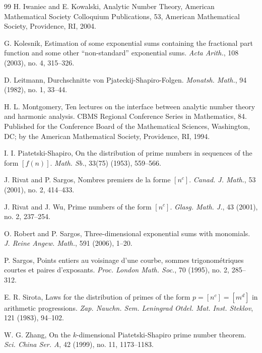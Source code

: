 \documentclass[12pt, reqno, twoside, letterpaper]{amsart}
\numberwithin{equation}{section}
\theoremstyle{customthm}
\theoremstyle{customrem}
\begin{document}
\begin{thebibliography}{99}
H. Iwaniec and E. Kowalski,
Analytic Number Theory, American Mathematical Society Colloquium Publications, 53, American Mathematical Society, Providence, RI, 2004.

G. Kolesnik,
Estimation of some exponential sums containing the fractional part function and some
other ``non-standard'' exponential sums.
\emph{Acta Arith.}, 108 (2003), no. 4, 315--326.

D. Leitmann,
Durchschnitte von Pjateckij-Shapiro-Folgen.
\emph{Monatsh. Math.}, 94 (1982), no. 1, 33--44.



H. L. Montgomery,
Ten lectures on the interface between analytic number theory and harmonic analysis. CBMS Regional Conference Series in Mathematics, 84. Published for the Conference Board of the Mathematical Sciences, Washington, DC; by the American Mathematical Society, Providence, RI, 1994.

I. I. Piatetski-Shapiro,
On the distribution of prime numbers in sequences of the form $[f(n)]$.
\emph{Math. Sb.}, 33(75) (1953), 559--566.

J. Rivat and P. Sargos,
Nombres premiers de la forme $[n^c]$.
\emph{Canad. J. Math.}, 53 (2001), no. 2, 414--433.

J. Rivat and J. Wu,
Prime numbers of the form $[n^c]$.
\emph{Glasg. Math. J.}, 43 (2001), no. 2, 237--254.

O. Robert and P. Sargos,
Three-dimensional exponential sums with monomials.
\emph{J. Reine Angew. Math.}, 591 (2006), 1--20.

P. Sargos,
Points entiers au voisinage d'une courbe, sommes trigonom\'{e}triques courtes et
paires d'exposants.
\emph{Proc. London Math. Soc.},  70 (1995), no. 2, 285--312.



E. R. Sirota,
Laws for the distribution of primes of the form $p=[n^c]=[m^d]$ in arithmetic progressions.
\emph{Zap. Nauchn. Sem. Leningrad Otdel. Mat. Inst. Steklov}, 121 (1983), 94--102.


W. G. Zhang,
On the $k$-dimensional Piatetski-Shapiro prime number theorem.
\emph{Sci. China Ser. A}, 42 (1999), no. 11, 1173--1183.




\end{thebibliography}
\end{document}
